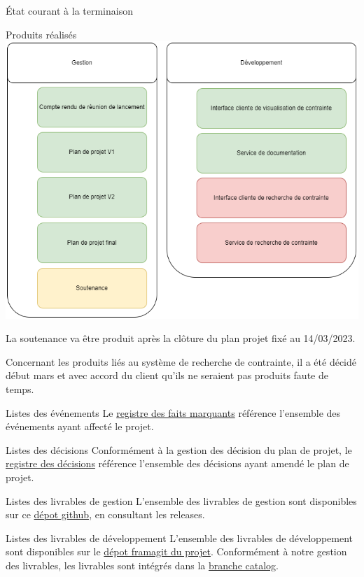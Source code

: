 \documentclass[]{article}
\begin{document}
{\begin{section}{État courant à la terminaison}
\begin{subsection}{Produits réalisés}
     \includegraphics[scale=0.49]{IMG/PBS_final}

     La soutenance va être produit après la clôture du plan projet fixé au 14/03/2023.

     Concernant les produits liés au système de recherche de contrainte, il a été décidé début mars et avec accord du client qu’ils ne seraient pas produits faute de temps.
 \end{subsection}

 \begin{subsection}{Listes des événements}
    Le \href{Registre_des_faits_marquants.pdf}{registre des faits marquants} référence l'ensemble des événements ayant affecté le projet.
\end{subsection}

 \begin{subsection}{Listes des décisions}
     Conformément à la gestion des décision du plan de projet, le \href{Registre_des_décisions.pdf}{registre des décisions} référence l'ensemble des décisions ayant amendé le plan de projet.
 \end{subsection}

 \begin{subsection}{Listes des livrables de gestion}
    L'ensemble des livrables de gestion sont disponibles sur ce \href{https://github.com/Szyckaa/UE-PROJET-DOCS-GESTION}{dépot github}, en consultant les releases.
\end{subsection}

\newpage

\begin{subsection}{Listes des livrables de développement}
    L'ensemble des livrables de développement sont disponibles sur le \href{https://framagit.org/flopedt/FlOpEDT}{dépot framagit du projet}. Conformément à notre gestion des livrables, les livrables sont intégrés dans la \href{https://framagit.org/flopedt/FlOpEDT/-/tree/catalog}{branche catalog}. 
\end{subsection}
\end{section}

}
\end{document}
